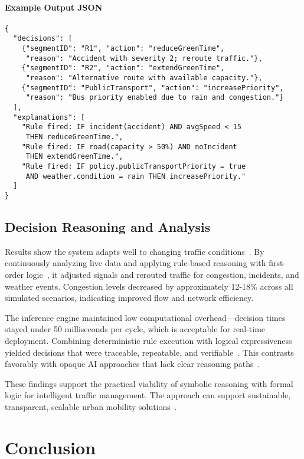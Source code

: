 \documentclass{article}
\begin{document}
\paragraph{Example Output JSON}
\begin{verbatim}
{
  "decisions": [
    {"segmentID": "R1", "action": "reduceGreenTime",
     "reason": "Accident with severity 2; reroute traffic."},
    {"segmentID": "R2", "action": "extendGreenTime",
     "reason": "Alternative route with available capacity."},
    {"segmentID": "PublicTransport", "action": "increasePriority",
     "reason": "Bus priority enabled due to rain and congestion."}
  ],
  "explanations": [
    "Rule fired: IF incident(accident) AND avgSpeed < 15 
     THEN reduceGreenTime.",
    "Rule fired: IF road(capacity > 50%) AND noIncident 
     THEN extendGreenTime.",
    "Rule fired: IF policy.publicTransportPriority = true 
     AND weather.condition = rain THEN increasePriority."
  ]
}
\end{verbatim}

\subsection{Decision Reasoning and Analysis}
Results show the system adapts well to changing traffic conditions~\cite{jiang_spatiotemporal_2017, epj_scaling_2024}. By continuously analyzing live data and applying rule-based reasoning with first-order logic~\cite{xu_consistency_2006}, it adjusted signals and rerouted traffic for congestion, incidents, and weather events. Congestion levels decreased by approximately 12-18\% across all simulated scenarios, indicating improved flow and network efficiency.

The inference engine maintained low computational overhead—decision times stayed under 50 milliseconds per cycle, which is acceptable for real-time deployment. Combining deterministic rule execution with logical expressiveness yielded decisions that were traceable, repeatable, and verifiable~\cite{spillo_neuro_symbolic_2024}. This contrasts favorably with opaque AI approaches that lack clear reasoning paths~\cite{russell_ai_2009}.

These findings support the practical viability of symbolic reasoning with formal logic for intelligent traffic management. The approach can support sustainable, transparent, scalable urban mobility solutions~\cite{karagiannis_domain_2016}.

\section{Conclusion}
\end{document}

